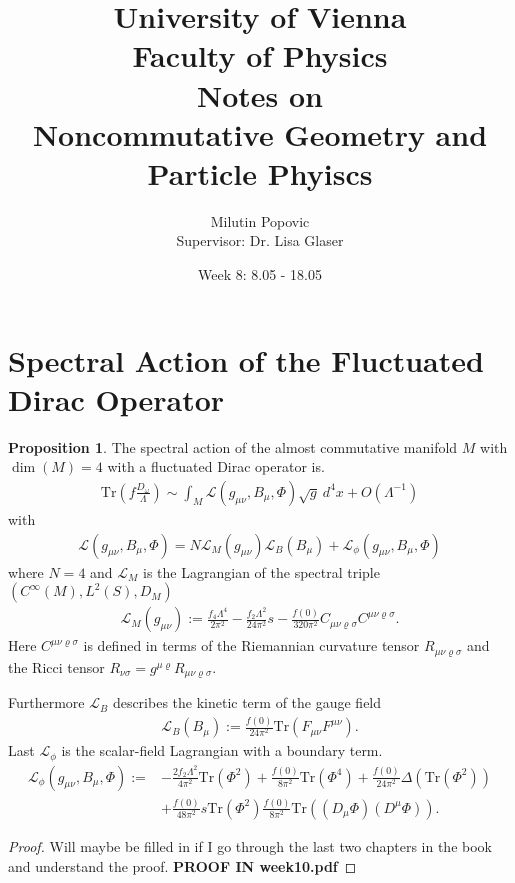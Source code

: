 \documentclass[a4paper]{article}
\title{University of Vienna\\ Faculty of Physics\\ \vspace{1.25cm}
Notes on\\ Noncommutative Geometry and Particle Phyiscs}
\author{Milutin Popovic \\ Supervisor: Dr. Lisa
Glaser}
\date{Week 8: 8.05 - 18.05}
\theoremstyle{definition}
\theoremstyle{definition}
\theoremstyle{definition}
\theoremstyle{theorem}
\theoremstyle{theorem}
\theoremstyle{theorem}
\newtheorem{proposition}{Proposition}
\begin{document}
    \maketitle
    \tableofcontents
    \newpage


\section{Spectral Action of the Fluctuated Dirac Operator}
\begin{proposition}
    The spectral action of the almost commutative manifold $M$ with $\dim(M)
    =4$ with a fluctuated Dirac operator is.
    \begin{align}
        \text{Tr}(f\frac{D_\omega}{\Lambda}) \sim \int_M \mathcal{L}(g_{\mu\nu},
         B_\mu, \Phi) \sqrt{g}\ d^4x + O(\Lambda^{-1})
    \end{align}
    with
    \begin{align}
        \mathcal{L}(g_{\mu\nu}, B_\mu, \Phi) =
        N\mathcal{L}_M(g_{\mu\nu})
        \mathcal{L}_B(B_\mu)+
        \mathcal{L}_\phi(g_{\mu\nu}, B_\mu, \Phi)
    \end{align}
    where $N=4$ and $\mathcal{L}_M$ is the Lagrangian of the spectral triple
    $(C^\infty(M) , L^2(S), D_M)$
    \begin{align}\label{lagr}
        \mathcal{L}_M(g_{\mu\nu}) := \frac{f_4 \Lambda ^4}{2\pi^2} -
        \frac{f_2 \Lambda^2}{24\pi ^2}s - \frac{f(0)}{320\pi^2} C_{\mu\nu
        \varrho \sigma}C^{\mu\nu \varrho \sigma}.
    \end{align}
    Here $C^{\mu\nu \varrho \sigma}$ is defined in terms of the Riemannian
    curvature tensor $R_{\mu\nu \varrho \sigma}$ and the Ricci tensor
    $R_{\nu\sigma} = g^{\mu\varrho} R_{\mu\nu \varrho\sigma}$.


    Furthermore $\mathcal{L}_B$ describes the kinetic term of the gauge field
    \begin{align}
        \mathcal{L}_B(B_\mu) := \frac{f(0)}{24\pi^2}
        \text{Tr}(F_{\mu\nu}F^{\mu\nu}).
    \end{align}
    Last $\mathcal{L}_\phi$ is the scalar-field Lagrangian with a boundary
    term.
    \begin{align}
        \mathcal{L}_\phi(g_{\mu\nu}, B_\mu, \Phi) :=
        &-\frac{2f_2\Lambda^2}{4\pi^2}\text{Tr}(\Phi^2) + \frac{f(0)}{8\pi^2}
        \text{Tr}(\Phi^4) + \frac{f(0)}{24\pi^2} \Delta(\text{Tr}(\Phi^2))\\
        &+ \frac{f(0)}{48\pi^2}s\text{Tr}(\Phi^2)
        \frac{f(0)}{8\pi^2}\text{Tr}((D_\mu \Phi)(D^\mu \Phi)).
    \end{align}
\end{proposition}
\begin{proof}
    Will maybe be filled in if I go through the last two chapters in the
    book and understand the proof.
    \textbf{PROOF IN week10.pdf}
\end{proof}
\end{document}
